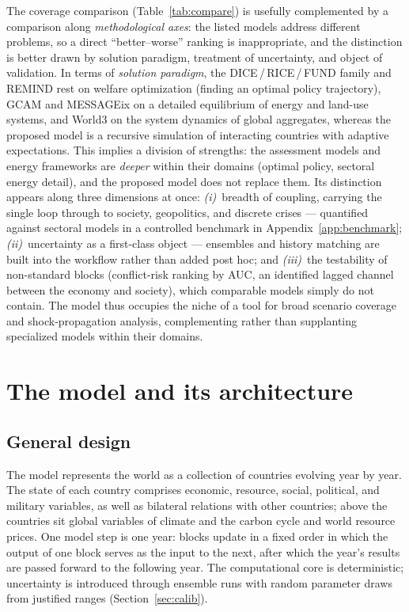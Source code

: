 \documentclass[11pt,a4paper]{article}
\begin{document}
The coverage comparison (Table~\ref{tab:compare}) is usefully complemented by a comparison along
\emph{methodological axes}: the listed models address different problems, so a direct
``better--worse'' ranking is inappropriate, and the distinction is better drawn by solution
paradigm, treatment of uncertainty, and object of validation. In terms of \emph{solution paradigm},
the DICE\,/\,RICE\,/\,FUND family and REMIND rest on welfare optimization (finding an optimal policy
trajectory), GCAM and MESSAGEix on a detailed equilibrium of energy and land-use systems, and World3
on the system dynamics of global aggregates, whereas the proposed model is a recursive simulation of
interacting countries with adaptive expectations. This implies a division of strengths: the
assessment models and energy frameworks are \emph{deeper} within their domains (optimal policy,
sectoral energy detail), and the proposed model does not replace them. Its distinction appears along
three dimensions at once: \emph{(i)}~breadth of coupling, carrying the single loop through to
society, geopolitics, and discrete crises --- quantified against sectoral models in a controlled
benchmark in Appendix~\ref{app:benchmark}; \emph{(ii)}~uncertainty as a first-class object ---
ensembles and history matching are built into the workflow rather than added post hoc; and
\emph{(iii)}~the testability of non-standard blocks (conflict-risk ranking by AUC, an identified
lagged channel between the economy and society), which comparable models simply do not contain. The
model thus occupies the niche of a tool for broad scenario coverage and shock-propagation analysis,
complementing rather than supplanting specialized models within their domains.

\section{The model and its architecture}

\subsection{General design}

The model represents the world as a collection of countries evolving year by year. The state of
each country comprises economic, resource, social, political, and military variables, as well as
bilateral relations with other countries; above the countries sit global variables of climate and
the carbon cycle and world resource prices. One model step is one year: blocks update in a fixed
order in which the output of one block serves as the input to the next, after which the year's
results are passed forward to the following year. The computational core is deterministic;
uncertainty is introduced through ensemble runs with random parameter draws from justified ranges
(Section~\ref{sec:calib}).
\end{document}
